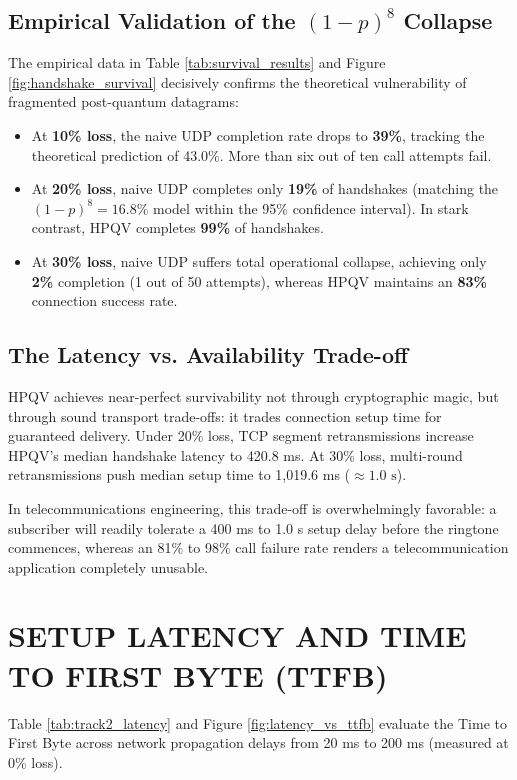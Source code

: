 \subsection{Empirical Validation of the $(1-p)^8$ Collapse}
The empirical data in Table \ref{tab:survival_results} and Figure \ref{fig:handshake_survival} decisively confirms the theoretical vulnerability of fragmented post-quantum datagrams:
\begin{itemize}
    \item At \textbf{10\% loss}, the naive UDP completion rate drops to \textbf{39\%}, tracking the theoretical prediction of 43.0\%. More than six out of ten call attempts fail.
    \item At \textbf{20\% loss}, naive UDP completes only \textbf{19\%} of handshakes (matching the $(1-p)^8 = 16.8\%$ model within the 95\% confidence interval). In stark contrast, HPQV completes \textbf{99\%} of handshakes.
    \item At \textbf{30\% loss}, naive UDP suffers total operational collapse, achieving only \textbf{2\%} completion (1 out of 50 attempts), whereas HPQV maintains an \textbf{83\%} connection success rate.
\end{itemize}

\subsection{The Latency vs. Availability Trade-off}
HPQV achieves near-perfect survivability not through cryptographic magic, but through sound transport trade-offs: it trades connection setup time for guaranteed delivery. Under 20\% loss, TCP segment retransmissions increase HPQV's median handshake latency to 420.8 ms. At 30\% loss, multi-round retransmissions push median setup time to 1,019.6 ms ($\approx 1.0\text{ s}$). 

In telecommunications engineering, this trade-off is overwhelmingly favorable: a subscriber will readily tolerate a 400 ms to 1.0 s setup delay before the ringtone commences, whereas an 81\% to 98\% call failure rate renders a telecommunication application completely unusable.

\section{SETUP LATENCY AND TIME TO FIRST BYTE (TTFB)}
Table \ref{tab:track2_latency} and Figure \ref{fig:latency_vs_ttfb} evaluate the Time to First Byte across network propagation delays from 20 ms to 200 ms (measured at 0\% loss).

